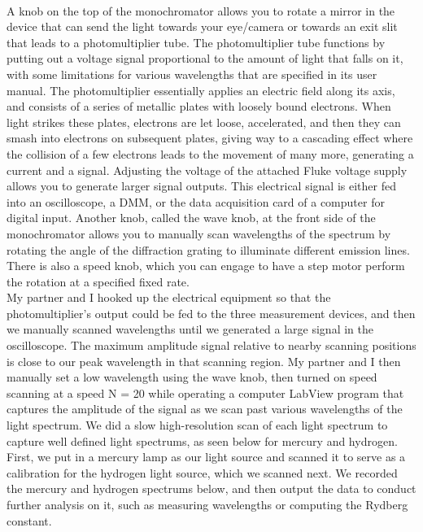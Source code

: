 \documentclass{article}
\begin{document}
    \\\indent A knob on the top of the monochromator allows you to rotate a mirror in the device that can send the light towards your eye/camera or towards an exit slit that leads to a photomultiplier tube. The photomultiplier tube functions by putting out a voltage signal proportional to the amount of light that falls on it, with some limitations for various wavelengths that are specified in its user manual. The photomultiplier essentially applies an electric field along its axis, and consists of a series of metallic plates with loosely bound electrons. When light strikes these plates, electrons are let loose, accelerated, and then they can smash into electrons on subsequent plates, giving way to a cascading effect where the collision of a few electrons leads to the movement of many more, generating a current and a signal. Adjusting the voltage of the attached Fluke voltage supply allows you to generate larger signal outputs. This electrical signal is either fed into an oscilloscope, a DMM, or the data acquisition card of a computer for digital input. Another knob, called the wave knob, at the front side of the monochromator allows you to manually scan wavelengths of the spectrum by rotating the angle of the diffraction grating to illuminate different emission lines. There is also a speed knob, which you can engage to have a step motor perform the rotation at a specified fixed rate. 
    \\\indent My partner and I hooked up the electrical equipment so that the photomultiplier's output could be fed to the three measurement devices, and then we manually scanned wavelengths until we generated a large signal in the oscilloscope. The maximum amplitude signal relative to nearby scanning positions is close to our peak wavelength in that scanning region. My partner and I then manually set a low wavelength using the wave knob, then turned on speed scanning at a speed N = 20 while operating a computer LabView program that captures the amplitude of the signal as we scan past various wavelengths of the light spectrum. We did a slow high-resolution scan of each light spectrum to capture well defined light spectrums, as seen below for mercury and hydrogen. First, we put in a mercury lamp as our light source and scanned it to serve as a calibration for the hydrogen light source, which we scanned next. We recorded the mercury and hydrogen spectrums below, and then output the data to conduct further analysis on it, such as measuring wavelengths or computing the Rydberg constant.
    
\end{document}
